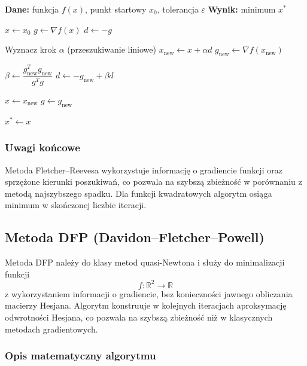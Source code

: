 \documentclass[10pt,a4paper]{article}
\begin{document}
\begin{algorithm}[H]
\caption{Metoda gradientów sprzężonych (Fletchera--Reevesa)}
\begin{algorithmic}[1]
\STATE \textbf{Dane:} funkcja $f(x)$, punkt startowy $x_0$, tolerancja $\varepsilon$
\STATE \textbf{Wynik:} minimum $x^\ast$

\STATE $x \leftarrow x_0$
\STATE $g \leftarrow \nabla f(x)$
\STATE $d \leftarrow -g$

    \STATE Wyznacz krok $\alpha$ (przeszukiwanie liniowe)
    \STATE $x_{\text{new}} \leftarrow x + \alpha d$
    \STATE $g_{\text{new}} \leftarrow \nabla f(x_{\text{new}})$

    \STATE $\beta \leftarrow \dfrac{g_{\text{new}}^{T} g_{\text{new}}}{g^{T} g}$
    \STATE $d \leftarrow -g_{\text{new}} + \beta d$

    \STATE $x \leftarrow x_{\text{new}}$
    \STATE $g \leftarrow g_{\text{new}}$
\ENDWHILE

\STATE $x^\ast \leftarrow x$
\end{algorithmic}
\end{algorithm}


\subsubsection{Uwagi końcowe}

Metoda Fletcher--Reevesa wykorzystuje informację o gradiencie funkcji
oraz sprzężone kierunki poszukiwań, co pozwala na szybszą zbieżność
w porównaniu z metodą najszybszego spadku. Dla funkcji kwadratowych
algorytm osiąga minimum w skończonej liczbie iteracji.


\subsection{Metoda DFP (Davidon--Fletcher--Powell)}

Metoda DFP należy do klasy metod quasi-Newtona i służy do minimalizacji
funkcji
\[
f:\mathbb{R}^2 \to \mathbb{R}
\]
z wykorzystaniem informacji o gradiencie, bez konieczności jawnego
obliczania macierzy Hesjana. Algorytm konstruuje w kolejnych iteracjach
aproksymację odwrotności Hesjana, co pozwala na szybszą zbieżność niż
w klasycznych metodach gradientowych.



\subsubsection{Opis matematyczny algorytmu}
\end{document}
